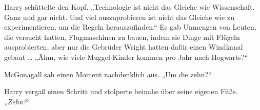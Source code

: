 Harry schüttelte den Kopf.
„Technologie ist nicht das Gleiche wie Wissenschaft. Ganz und gar nicht. Und viel auszuprobieren ist nicht das Gleiche wie zu experimentieren, um die Regeln herauszufinden.“ Es gab Unmengen von Leuten, die versucht hatten, Flugmaschinen zu bauen, indem sie Dinge mit Flügeln ausprobierten, aber nur die Gebrüder Wright hatten dafür einen Windkanal gebaut … „Ähm, wie viele Muggel-Kinder kommen pro Jahr nach Hogwarts?“

McGonagall sah einen Moment nachdenklich aus.
„Um die zehn?“

Harry vergaß einen Schritt und stolperte beinahe über seine eigenen Füße.
„\emph{Zehn?}“

